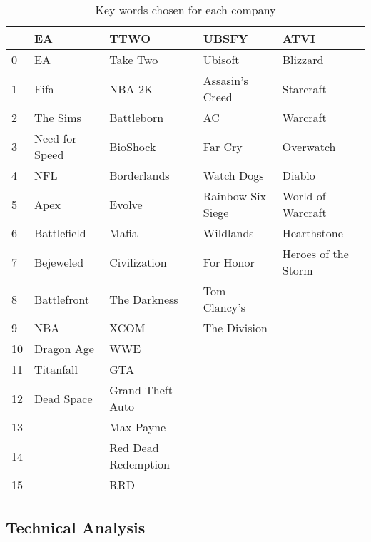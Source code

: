 \documentclass[11pt]{article} %
\begin{document}
\begin{table}[hbt!]
\centering
\caption{Key words chosen for each company}
\begin{tabular}{lllll}
\toprule
{} &              EA &                 TTWO &              UBSFY &                 ATVI \\
\midrule
0  &              EA &             Take Two &            Ubisoft &             Blizzard \\
1  &            Fifa &               NBA 2K &    Assasin's Creed &            Starcraft \\
2  &        The Sims &           Battleborn &                 AC &             Warcraft \\
3  &  Need for Speed &             BioShock &            Far Cry &            Overwatch \\
4  &             NFL &          Borderlands &         Watch Dogs &               Diablo \\
5  &            Apex &               Evolve &  Rainbow Six Siege &    World of Warcraft \\
6  &     Battlefield &                Mafia &          Wildlands &          Hearthstone \\
7  &       Bejeweled &         Civilization &          For Honor &  Heroes of the Storm \\
8  &     Battlefront &         The Darkness &       Tom Clancy's &                  \\
9  &             NBA &                 XCOM &       The Division &                  \\
10 &      Dragon Age &                  WWE &                &                  \\
11 &       Titanfall &                  GTA &                &                  \\
12 &      Dead Space &     Grand Theft Auto &                &                  \\
13 &             &            Max Payne &                &                  \\
14 &             &  Red Dead Redemption &                &                  \\
15 &             &                  RRD &                &                  \\
\bottomrule
\end{tabular}
\end{table}

\subsection{Technical Analysis}
\end{document}
